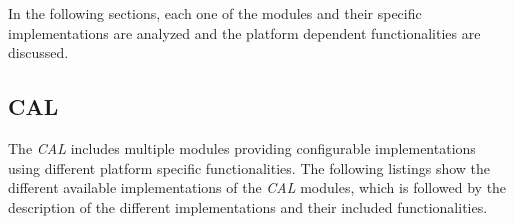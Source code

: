 In the following sections, each one of the modules and their specific implementations are analyzed and the platform dependent functionalities are discussed.

\subsection{CAL}
\label{sec:oplk_platform_cal}

The \emph{CAL} includes multiple modules providing configurable implementations using different platform specific functionalities.
The following listings show the different available implementations of the \emph{CAL} modules, which is followed by the description of the different implementations and their included functionalities.
\\
    
